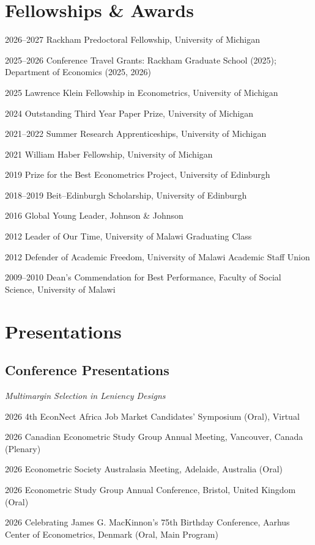 \documentclass[11pt]{article}
\begin{document}
\section*{Fellowships \& Awards}
\begin{dated}
\item[2026--2027] Rackham Predoctoral Fellowship, University of Michigan
\item[2025--2026] Conference Travel Grants: Rackham Graduate School (2025); Department of Economics (2025, 2026)
\item[2025] Lawrence Klein Fellowship in Econometrics, University of Michigan
\item[2024] Outstanding Third Year Paper Prize, University of Michigan
\item[2021--2022] Summer Research Apprenticeships, University of Michigan
\item[2021] William Haber Fellowship, University of Michigan
\item[2019] Prize for the Best Econometrics Project, University of Edinburgh
\item[2018--2019] Beit--Edinburgh Scholarship, University of Edinburgh
\item[2016] Global Young Leader, Johnson \& Johnson
\item[2012] Leader of Our Time, University of Malawi Graduating Class
\item[2012] Defender of Academic Freedom, University of Malawi Academic Staff Union
\item[2009--2010] Dean's Commendation for Best Performance, Faculty of Social Science, University of Malawi
\end{dated}

\section*{Presentations}
\subsection*{Conference Presentations}
\textit{Multimargin Selection in Leniency Designs}
\begin{dated}
\item[2026] 4th EconNect Africa Job Market Candidates' Symposium (Oral), Virtual
\item[2026] Canadian Econometric Study Group Annual Meeting, Vancouver, Canada (Plenary)
\item[2026] Econometric Society Australasia Meeting, Adelaide, Australia (Oral)
\item[2026] Econometric Study Group Annual Conference, Bristol, United Kingdom (Oral)
\item[2026] Celebrating James G. MacKinnon's 75th Birthday Conference, Aarhus Center of Econometrics, Denmark (Oral, Main Program)
\end{dated}
\end{document}

